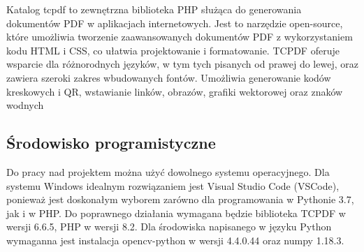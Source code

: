 \documentclass[12pt,a4paper,oneside]{article}
\theoremstyle{definition}
\numberwithin{equation}{section}
\begin{document}
Katalog tcpdf to zewnętrzna biblioteka PHP służąca do generowania dokumentów PDF w aplikacjach internetowych. Jest to narzędzie open-source, które umożliwia tworzenie zaawansowanych dokumentów PDF z wykorzystaniem kodu HTML i CSS, co ułatwia projektowanie i formatowanie. TCPDF oferuje wsparcie dla różnorodnych języków, w tym tych pisanych od prawej do lewej, oraz zawiera szeroki zakres wbudowanych fontów. Umożliwia generowanie kodów kreskowych i QR, wstawianie linków, obrazów, grafiki wektorowej oraz znaków wodnych



\subsection{Środowisko programistyczne}

Do pracy nad projektem można użyć dowolnego systemu operacyjnego. Dla systemu Windows idealnym rozwiązaniem jest Visual Studio Code (VSCode), ponieważ jest doskonałym wyborem zarówno dla programowania w Pythonie 3.7, jak i w PHP. Do poprawnego działania wymagana będzie biblioteka TCPDF w wersji 6.6.5, PHP w wersji 8.2. Dla środowiska napisanego w języku Python wymaganna jest instalacja opencv-python w wersji 4.4.0.44 oraz numpy 1.18.3. 

























\renewcommand\refname{Literatura (jeżeli wymagana)}

%
%
%
\end{document}
